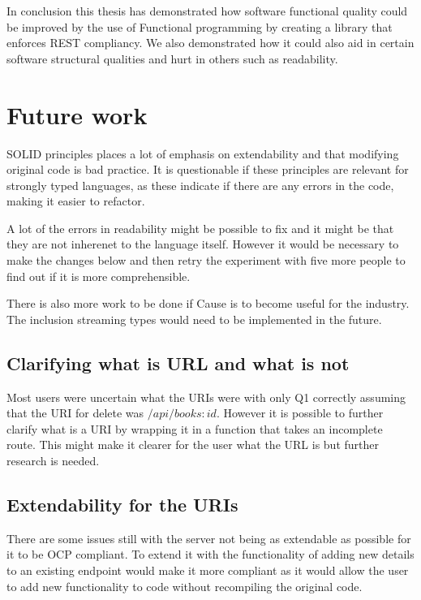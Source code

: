 In conclusion this thesis has demonstrated how software functional quality could
be improved by the use of Functional programming by creating a library that
enforces REST compliancy. We also demonstrated how it could also aid in certain
software structural qualities and hurt in others such as readability.

\section{Future work}\label{futurework}

SOLID principles places a lot of emphasis on extendability and that modifying
original code is bad practice. It is questionable if these principles are
relevant for strongly typed languages, as these indicate if there are any
errors in the code, making it easier to refactor.

A lot of the errors in readability might be possible to fix and it might be
that they are not inherenet to the language itself. However it would be
necessary to make the changes below and then retry the experiment with five 
more people to find out if it is more comprehensible. 

There is also more work to be done if Cause is to become useful for the
industry. The inclusion streaming types would need to be implemented in the
future.

\subsection{Clarifying what is URL and what is not}

Most users were uncertain what the URIs were with only Q1 correctly assuming
that the URI for delete was $/api/books:id$. However it is possible to further
clarify what is a URI by wrapping it in a function that takes an incomplete
route. This might make it clearer for the user what the URL is but further
research is needed.

\subsection{Extendability for the URIs}

There are some issues still with the server not being as extendable as possible
for it to be OCP compliant. To extend it with the functionality of adding new
details to an existing endpoint would make it more compliant as it would allow
the user to add new functionality to code without recompiling the original
code.


